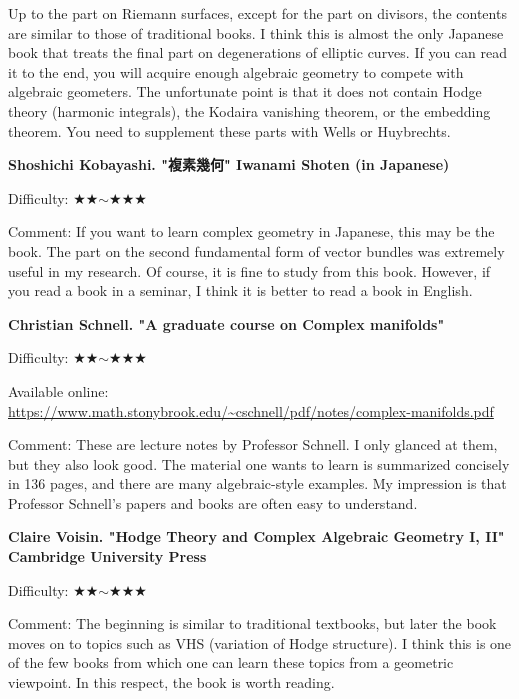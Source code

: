 Up to the part on Riemann surfaces, except for the part on divisors, the contents are similar to those of traditional books.
 I think this is almost the only Japanese book that treats the final part on degenerations of elliptic curves.
  If you can read it to the end, you will acquire enough algebraic geometry to compete with algebraic geometers. The unfortunate point is that it does not contain Hodge theory (harmonic integrals), the Kodaira vanishing theorem, or the embedding theorem. You need to supplement these parts with Wells or Huybrechts.
\vspace{8pt}

\textbf{Shoshichi Kobayashi. "複素幾何" Iwanami Shoten  (in Japanese)}  \vspace{-6pt} 

Difficulty: ★★$\sim$★★★ \vspace{-6pt} 

Comment: If you want to learn complex geometry in Japanese, this may be the book. The part on the second fundamental form of vector bundles was extremely useful in my research. Of course, it is fine to study from this book. However, if you read a book in a seminar, I think it is better to read a book in English.
\vspace{8pt}

\textbf{Christian Schnell. "A graduate course on Complex manifolds" }  \vspace{-6pt} 

Difficulty: ★★$\sim$★★★ \vspace{-6pt} 

Available online: \url{https://www.math.stonybrook.edu/~cschnell/pdf/notes/complex-manifolds.pdf} \vspace{-6pt} 

Comment: These are lecture notes by Professor Schnell. I only glanced at them, but they also look good. The material one wants to learn is summarized concisely in 136 pages, and there are many algebraic-style examples. My impression is that Professor Schnell's papers and books are often easy to understand. 
\vspace{8pt}

\textbf{Claire Voisin. "Hodge Theory and Complex Algebraic Geometry I, II" Cambridge University Press}  \vspace{-6pt} 

Difficulty: ★★$\sim$★★★ \vspace{-6pt} 

Comment: The beginning is similar to traditional textbooks, but later the book moves on to topics such as VHS (variation of Hodge structure). I think this is one of the few books from which one can learn these topics from a geometric viewpoint. In this respect, the book is worth reading. 
\vspace{8pt}

